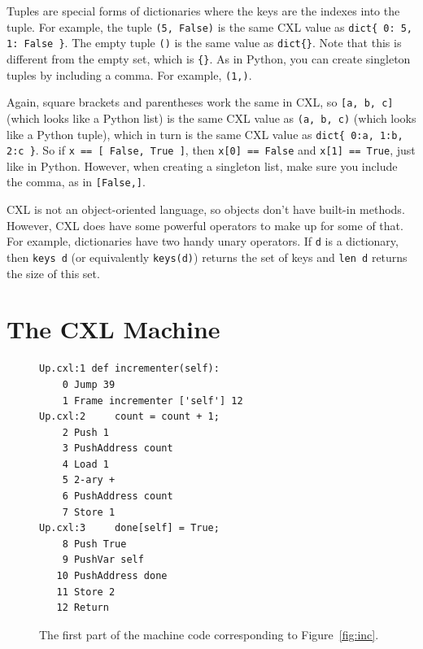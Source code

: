 \documentclass{report}
\newenvironment{code}{
\tcolorbox
}{
\endtcolorbox
}
\begin{document}
Tuples are special forms of dictionaries where the keys are
the indexes into the tuple.  For example, the tuple
\texttt{(5, False)} is the same CXL value as
\texttt{dict\{ 0: 5, 1: False \}}.
The empty tuple \texttt{()} is the same value as \texttt{dict\{\}}.
Note that this is different from the empty set, which is \texttt{\{\}}.
As in Python, you can create singleton tuples by including a comma.
For example, \texttt{(1,)}.

Again, square brackets and parentheses work the same in CXL, so
\texttt{[a, b, c]} (which looks like a Python list)
is the same CXL value as \texttt{(a, b, c)} (which looks like a Python tuple),
which in turn is the same CXL value as \texttt{dict\{ 0:a, 1:b, 2:c \}}.
So if \texttt{x == [ False, True ]},
then \texttt{x[0] == False} and \texttt{x[1] == True}, just like in Python.
However, when creating a singleton list, make sure you include the
comma, as in \texttt{[False,]}.

CXL is not an object-oriented language, so objects don't have
built-in methods.  However, CXL does have some powerful operators to
make up for some of that.
For example, dictionaries have two handy unary operators.
If \texttt{d} is a
dictionary, then \texttt{keys~d} (or equivalently \texttt{keys(d)})
returns the set of keys and \texttt{len~d} returns the size of
this set.

\chapter{The CXL Machine}
\label{ch:cxlmachine}

\begin{figure}
\begin{code}
\begin{verbatim}
Up.cxl:1 def incrementer(self):
    0 Jump 39
    1 Frame incrementer ['self'] 12
Up.cxl:2     count = count + 1;
    2 Push 1
    3 PushAddress count
    4 Load 1
    5 2-ary +
    6 PushAddress count
    7 Store 1
Up.cxl:3     done[self] = True;
    8 Push True
    9 PushVar self
   10 PushAddress done
   11 Store 2
   12 Return
\end{verbatim}
\end{code}
\caption{The first part of the machine code corresponding to Figure~\ref{fig:inc}.}
\label{fig:inccode}
\end{figure}
\end{document}
